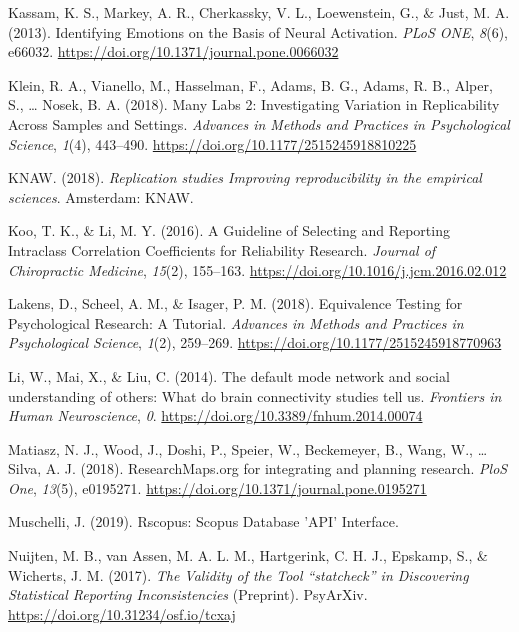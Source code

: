 \documentclass[
  english,
  man,floatsintext]{apa6}
\newlength{\cslhangindent}
\newlength{\cslentryspacingunit} %
\newenvironment{CSLReferences}[2] %
 {%
  \setlength{\parindent}{0pt}
  \ifodd #1
  \let\oldpar\par
  \def\par{\hangindent=\cslhangindent\oldpar}
  \fi
  \setlength{\parskip}{#2\cslentryspacingunit}
 }%
 {}
\begin{document}
\begin{CSLReferences}{1}{0}
\leavevmode{}%
Kassam, K. S., Markey, A. R., Cherkassky, V. L., Loewenstein, G., \& Just, M. A. (2013). Identifying {Emotions} on the {Basis} of {Neural Activation}. \emph{PLoS ONE}, \emph{8}(6), e66032. \url{https://doi.org/10.1371/journal.pone.0066032}

\leavevmode{}%
Klein, R. A., Vianello, M., Hasselman, F., Adams, B. G., Adams, R. B., Alper, S., \ldots{} Nosek, B. A. (2018). Many {Labs} 2: {Investigating Variation} in {Replicability Across Samples} and {Settings}. \emph{Advances in Methods and Practices in Psychological Science}, \emph{1}(4), 443--490. \url{https://doi.org/10.1177/2515245918810225}

\leavevmode{}%
KNAW. (2018). \emph{Replication studies \textendash{} {Improving} reproducibility in the empirical sciences}. {Amsterdam}: {KNAW}.

\leavevmode{}%
Koo, T. K., \& Li, M. Y. (2016). A {Guideline} of {Selecting} and {Reporting Intraclass Correlation Coefficients} for {Reliability Research}. \emph{Journal of Chiropractic Medicine}, \emph{15}(2), 155--163. \url{https://doi.org/10.1016/j.jcm.2016.02.012}

\leavevmode{}%
Lakens, D., Scheel, A. M., \& Isager, P. M. (2018). Equivalence {Testing} for {Psychological Research}: {A Tutorial}. \emph{Advances in Methods and Practices in Psychological Science}, \emph{1}(2), 259--269. \url{https://doi.org/10.1177/2515245918770963}

\leavevmode{}%
Li, W., Mai, X., \& Liu, C. (2014). The default mode network and social understanding of others: What do brain connectivity studies tell us. \emph{Frontiers in Human Neuroscience}, \emph{0}. \url{https://doi.org/10.3389/fnhum.2014.00074}

\leavevmode{}%
Matiasz, N. J., Wood, J., Doshi, P., Speier, W., Beckemeyer, B., Wang, W., \ldots{} Silva, A. J. (2018). {ResearchMaps}.org for integrating and planning research. \emph{PloS One}, \emph{13}(5), e0195271. \url{https://doi.org/10.1371/journal.pone.0195271}

\leavevmode{}%
Muschelli, J. (2019). Rscopus: {Scopus Database} '{API}' {Interface}.

\leavevmode{}%
Nuijten, M. B., van Assen, M. A. L. M., Hartgerink, C. H. J., Epskamp, S., \& Wicherts, J. M. (2017). \emph{The {Validity} of the {Tool} {``statcheck''} in {Discovering Statistical Reporting Inconsistencies}} (Preprint). {PsyArXiv}. \url{https://doi.org/10.31234/osf.io/tcxaj}


\end{CSLReferences}
\end{document}
